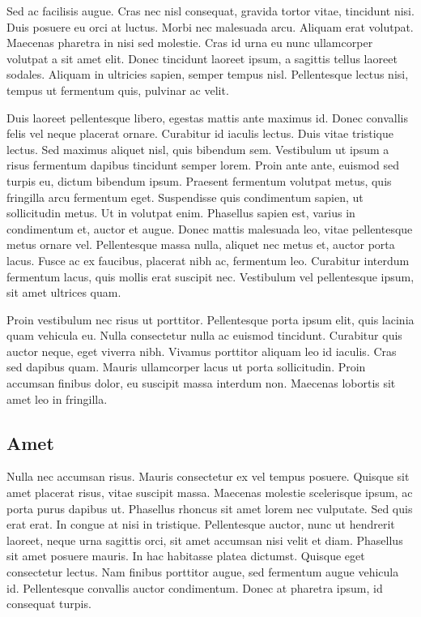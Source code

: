 Sed ac facilisis augue. Cras nec nisl consequat, gravida tortor vitae, tincidunt nisi. Duis posuere eu orci at luctus. Morbi nec malesuada arcu. Aliquam erat volutpat. Maecenas pharetra in nisi sed molestie. Cras id urna eu nunc ullamcorper volutpat a sit amet elit. Donec tincidunt laoreet ipsum, a sagittis tellus laoreet sodales. Aliquam in ultricies sapien, semper tempus nisl. Pellentesque lectus nisi, tempus ut fermentum quis, pulvinar ac velit.

Duis laoreet pellentesque libero, egestas mattis ante maximus id. Donec convallis felis vel neque placerat ornare. Curabitur id iaculis lectus. Duis vitae tristique lectus. Sed maximus aliquet nisl, quis bibendum sem. Vestibulum ut ipsum a risus fermentum dapibus tincidunt semper lorem. Proin ante ante, euismod sed turpis eu, dictum bibendum ipsum. Praesent fermentum volutpat metus, quis fringilla arcu fermentum eget. Suspendisse quis condimentum sapien, ut sollicitudin metus. Ut in volutpat enim. Phasellus sapien est, varius in condimentum et, auctor et augue. Donec mattis malesuada leo, vitae pellentesque metus ornare vel. Pellentesque massa nulla, aliquet nec metus et, auctor porta lacus. Fusce ac ex faucibus, placerat nibh ac, fermentum leo. Curabitur interdum fermentum lacus, quis mollis erat suscipit nec. Vestibulum vel pellentesque ipsum, sit amet ultrices quam.

Proin vestibulum nec risus ut porttitor. Pellentesque porta ipsum elit, quis lacinia quam vehicula eu. Nulla consectetur nulla ac euismod tincidunt. Curabitur quis auctor neque, eget viverra nibh. Vivamus porttitor aliquam leo id iaculis. Cras sed dapibus quam. Mauris ullamcorper lacus ut porta sollicitudin. Proin accumsan finibus dolor, eu suscipit massa interdum non. Maecenas lobortis sit amet leo in fringilla.

\subsection{Amet} %
\label{sub:amet}
Nulla nec accumsan risus. Mauris consectetur ex vel tempus posuere. Quisque sit amet placerat risus, vitae suscipit massa. Maecenas molestie scelerisque ipsum, ac porta purus dapibus ut. Phasellus rhoncus sit amet lorem nec vulputate. Sed quis erat erat. In congue at nisi in tristique. Pellentesque auctor, nunc ut hendrerit laoreet, neque urna sagittis orci, sit amet accumsan nisi velit et diam. Phasellus sit amet posuere mauris. In hac habitasse platea dictumst. Quisque eget consectetur lectus. Nam finibus porttitor augue, sed fermentum augue vehicula id. Pellentesque convallis auctor condimentum. Donec at pharetra ipsum, id consequat turpis.

